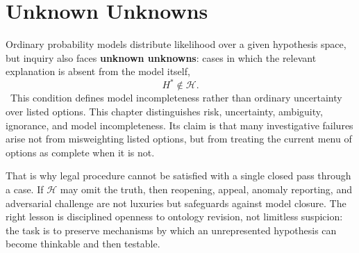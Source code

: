 
\chapter{Unknown Unknowns}
\label{ch:ch016}

Ordinary probability models distribute likelihood over a given hypothesis space, but inquiry also faces \textbf{unknown unknowns}: cases in which the relevant explanation is absent from the model itself,
\[
H^\ast\notin\mathcal H.
\]
\Definition\ This condition defines model incompleteness rather than ordinary uncertainty over listed options.
This chapter distinguishes risk, uncertainty, ambiguity, ignorance, and model incompleteness. Its claim is that many investigative failures arise not from misweighting listed options, but from treating the current menu of options as complete when it is not.

That is why legal procedure cannot be satisfied with a single closed pass through a case. If \(\mathcal H\) may omit the truth, then reopening, appeal, anomaly reporting, and adversarial challenge are not luxuries but safeguards against model closure. The right lesson is disciplined openness to ontology revision, not limitless suspicion: the task is to preserve mechanisms by which an unrepresented hypothesis can become thinkable and then testable.
